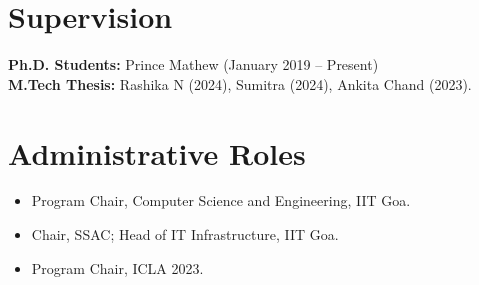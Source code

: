 \documentclass[11pt]{article}
\begin{document}
\section*{Supervision}
\textbf{Ph.D. Students:} Prince Mathew (January 2019 -- Present) \\
\textbf{M.Tech Thesis:} Rashika N (2024), Sumitra (2024), Ankita Chand (2023).

\section*{Administrative Roles}
\begin{itemize}
    \item Program Chair, Computer Science and Engineering, IIT Goa.
    \item Chair, SSAC; Head of IT Infrastructure, IIT Goa.
    \item Program Chair, ICLA 2023.
\end{itemize}
\end{document}
